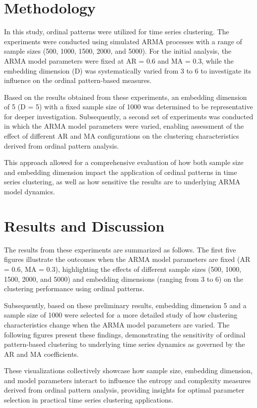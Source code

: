 \documentclass[12pt,a4paper]{article}
\begin{document}
\section{Methodology}
In this study, ordinal patterns were utilized for time series clustering. The experiments were conducted using simulated ARMA processes with a range of sample sizes (500, 1000, 1500, 2000, and 5000). For the initial analysis, the ARMA model parameters were fixed at AR = 0.6 and MA = 0.3, while the embedding dimension (D) was systematically varied from 3 to 6 to investigate its influence on the ordinal pattern-based measures.

Based on the results obtained from these experiments, an embedding dimension of 5 (D = 5) with a fixed sample size of 1000 was determined to be representative for deeper investigation. Subsequently, a second set of experiments was conducted in which the ARMA model parameters were varied, enabling assessment of the effect of different AR and MA configurations on the clustering characteristics derived from ordinal pattern analysis.

This approach allowed for a comprehensive evaluation of how both sample size and embedding dimension impact the application of ordinal patterns in time series clustering, as well as how sensitive the results are to underlying ARMA model dynamics. 


\section{Results and Discussion}
The results from these experiments are summarized as follows. The first five figures illustrate the outcomes when the ARMA model parameters are fixed (AR = 0.6, MA = 0.3), highlighting the effects of different sample sizes (500, 1000, 1500, 2000, and 5000) and embedding dimensions (ranging from 3 to 6) on the clustering performance using ordinal patterns.

Subsequently, based on these preliminary results, embedding dimension 5 and a sample size of 1000 were selected for a more detailed study of how clustering characteristics change when the ARMA model parameters are varied. The following figures present these findings, demonstrating the sensitivity of ordinal pattern-based clustering to underlying time series dynamics as governed by the AR and MA coefficients.

These visualizations collectively showcase how sample size, embedding dimension, and model parameters interact to influence the entropy and complexity measures derived from ordinal pattern analysis, providing insights for optimal parameter selection in practical time series clustering applications.
\end{document}
